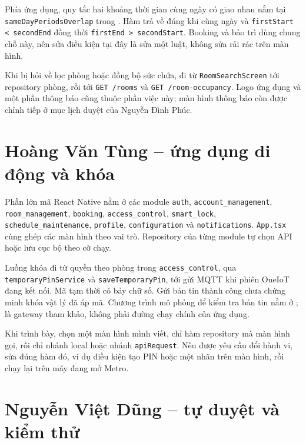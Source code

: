 \documentclass[../DoAn.tex]{subfiles}
\begin{document}
Phía ứng dụng, quy tắc hai khoảng thời gian cùng ngày có giao nhau nằm tại \texttt{sameDayPeriodsOverlap} trong . Hàm trả về đúng khi cùng ngày và \texttt{firstStart < secondEnd} đồng thời \texttt{firstEnd > secondStart}. Booking và bảo trì dùng chung chỗ này, nên sửa điều kiện tại đây là sửa một luật, không sửa rải rác trên màn hình.

Khi bị hỏi về lọc phòng hoặc đồng bộ sức chứa, đi từ \texttt{RoomSearchScreen} tới repository phòng, rồi tới \texttt{GET /rooms} và \texttt{GET /room-occupancy}. Logo ứng dụng và một phần thông báo cũng thuộc phần việc này; màn hình thông báo còn được chỉnh tiếp ở mục lịch duyệt của Nguyễn Đình Phúc.

\section{Hoàng Văn Tùng -- ứng dụng di động và khóa}
\label{section:assignment-tung}

Phần lớn mã React Native nằm ở các module \texttt{auth}, \texttt{account\_management}, \texttt{room\_management}, \texttt{booking}, \texttt{access\_control}, \texttt{smart\_lock}, \texttt{schedule\_maintenance}, \texttt{profile}, \texttt{configuration} và \texttt{notifications}. \texttt{App.tsx} cùng  ghép các màn hình theo vai trò. Repository của từng module tự chọn API hoặc lưu cục bộ theo cờ chạy.

Luồng khóa đi từ quyền theo phòng trong \texttt{access\_control}, qua \texttt{temporaryPinService} và \texttt{saveTemporaryPin}, tới gửi MQTT khi phiên OneIoT đang kết nối. Mã tạm thời có bảy chữ số. Gửi bản tin thành công chưa chứng minh khóa vật lý đã áp mã. Chương trình mô phỏng để kiểm tra bản tin nằm ở ;  là gateway tham khảo, không phải đường chạy chính của ứng dụng.

Khi trình bày, chọn một màn hình mình viết, chỉ hàm repository mà màn hình gọi, rồi chỉ nhánh local hoặc nhánh \texttt{apiRequest}. Nếu được yêu cầu đổi hành vi, sửa đúng hàm đó, ví dụ điều kiện tạo PIN hoặc một nhãn trên màn hình, rồi chạy lại trên máy đang mở Metro.

\section{Nguyễn Việt Dũng -- tự duyệt và kiểm thử}
\label{section:assignment-dung}
\end{document}
